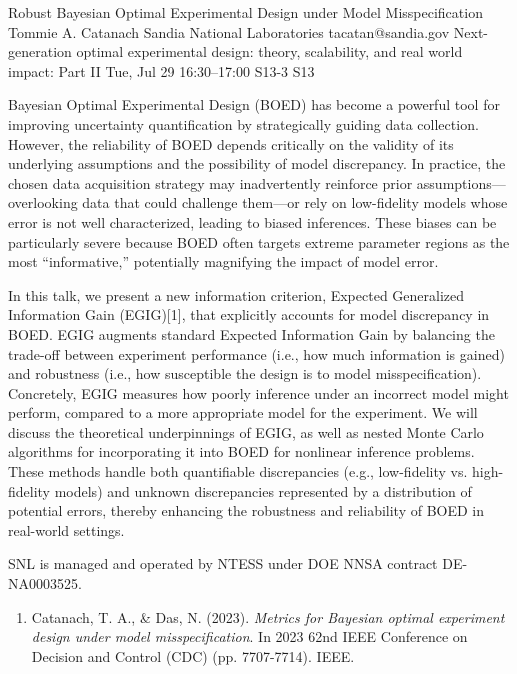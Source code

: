 \documentclass[12pt,lettersize,oneside]{book} %
\begin{document}
\begin{talk}
  {Robust Bayesian Optimal Experimental Design under Model Misspecification}%
  {Tommie A. Catanach}%
  {Sandia National Laboratories}%
  {tacatan@sandia.gov}%
  {Next-generation optimal experimental design: theory, scalability, and real world impact: Part II}%
  {}%
  {Tue, Jul 29 16:30--17:00}%
  {S13-3}%
  {S13}%
    
   
Bayesian Optimal Experimental Design (BOED) has become a powerful tool for improving uncertainty quantification by strategically guiding data collection. However, the reliability of BOED depends critically on the validity of its underlying assumptions and the possibility of model discrepancy. In practice, the chosen data acquisition strategy may inadvertently reinforce prior assumptions—overlooking data that could challenge them—or rely on low-fidelity models whose error is not well characterized, leading to biased inferences. These biases can be particularly severe because BOED often targets extreme parameter regions as the most “informative,” potentially magnifying the impact of model error.

In this talk, we present a new information criterion, Expected Generalized Information Gain (EGIG)[1], that explicitly accounts for model discrepancy in BOED. EGIG augments standard Expected Information Gain by balancing the trade-off between experiment performance (i.e., how much information is gained) and robustness (i.e., how susceptible the design is to model misspecification). Concretely, EGIG measures how poorly inference under an incorrect model might perform, compared to a more appropriate model for the experiment. We will discuss the theoretical underpinnings of EGIG, as well as nested Monte Carlo algorithms for incorporating it into BOED for nonlinear inference problems. These methods handle both quantifiable discrepancies (e.g., low-fidelity vs. high-fidelity models) and unknown discrepancies represented by a distribution of potential errors, thereby enhancing the robustness and reliability of BOED in real-world settings.

SNL is managed and operated by NTESS under DOE NNSA contract DE-NA0003525. 
\medskip

\begin{enumerate}
 \item[{[1]}] Catanach, T. A., \& Das, N. (2023). {\it Metrics for Bayesian optimal experiment design under model misspecification}. In 2023 62nd IEEE Conference on Decision and Control (CDC) (pp. 7707-7714). IEEE.
\end{enumerate}
\end{talk}
\end{document}
